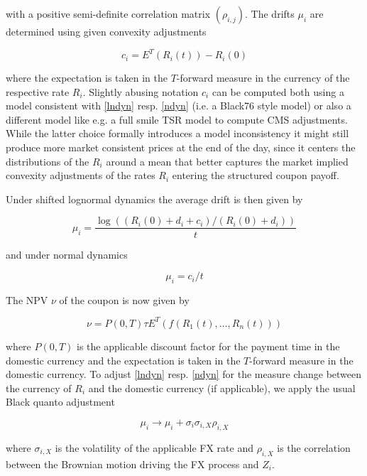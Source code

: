 \documentclass[12pt, a4paper]{article}
\begin{document}
with a positive semi-definite correlation matrix $( \rho_{i,j})$. The
drifts $\mu_i$ are determined using given convexity adjustments

\begin{equation} c_i = E^T(R_i(t)) - R_i(0)
\end{equation}

where the expectation is taken in the $T$-forward measure in the
currency of the respective rate $R_i$. Slightly abusing notation $c_i$
can be computed both using a model consistent with \ref{lndyn}
resp. \ref{ndyn} (i.e. a Black76 style model) or also a different
model like e.g. a full smile TSR model to compute CMS
adjustments. While the latter choice formally introduces a model
inconsistency it might still produce more market consistent prices at
the end of the day, since it centers the distributions of the $R_i$
around a mean that better captures the market implied convexity
adjustments of the rates $R_i$ entering the structured coupon payoff.

Under shifted lognormal dynamics the average drift is then given by

\begin{equation} \mu_i = \frac{\log( (R_i(0)+d_i+c_i) / (R_i(0)+d_i)
)}{t}
\end{equation}

and under normal dynamics

\begin{equation} \mu_i = c_i / t
\end{equation}

The NPV $\nu$ of the coupon is now given by

\begin{equation}\label{struccpnnpv} \nu = P(0,T) \tau E^T ( f(R_1(t),
\ldots, R_n(t)) )
\end{equation}

where $P(0,T)$ is the applicable discount factor for the payment time
in the domestic currency and the expectation is taken in the
$T$-forward measure in the domestic currency. To adjust \ref{lndyn}
resp. \ref{ndyn} for the measure change between the currency of $R_i$
and the domestic currency (if applicable), we apply the usual Black
quanto adjustment

\begin{equation}
  \mu_i \rightarrow \mu_i + \sigma_i \sigma_{i,X} \rho_{i,X}
\end{equation}

where $\sigma_{i,X}$ is the volatility of the applicable FX rate and
$\rho_{i,X}$ is the correlation between the Brownian motion driving
the FX process and $Z_i$.
\end{document}
